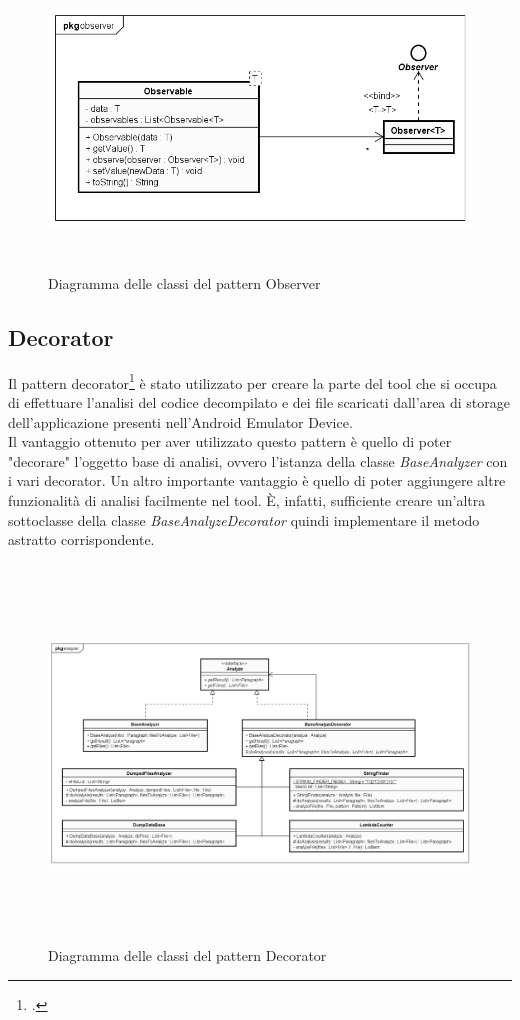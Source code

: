 \begin{figure}[H]
    \centering
    \includegraphics[width=14cm, height=8cm]{./immagini/diagrammi_uml/Observer.png}
    \caption{Diagramma delle classi del pattern Observer}\label{fig:observer}
\end{figure}

\newpage
\subsection{Decorator}\label{subsec:decorator}
Il pattern decorator\footcite{womak:decorator} è stato utilizzato per creare la parte del tool che si occupa
di effettuare l’analisi del codice decompilato e dei file scaricati dall’area di storage
dell’applicazione presenti nell’Android Emulator Device.\\
Il vantaggio ottenuto per aver utilizzato questo pattern è quello di poter "decorare" l’oggetto base di analisi, ovvero l’istanza della classe \textit{BaseAnalyzer} con i vari decorator.
Un altro importante vantaggio è quello di poter aggiungere altre funzionalità
di analisi facilmente nel tool.
È, infatti, sufficiente creare un’altra sottoclasse della classe \textit{BaseAnalyzeDecorator} quindi implementare il metodo astratto corrispondente.

\begin{figure}[H]
    \centering
    \includegraphics[width=14cm, height=10cm]{./immagini/diagrammi_uml/Decorator.png}
    \caption{Diagramma delle classi del pattern Decorator}\label{fig:decorator}
\end{figure}

